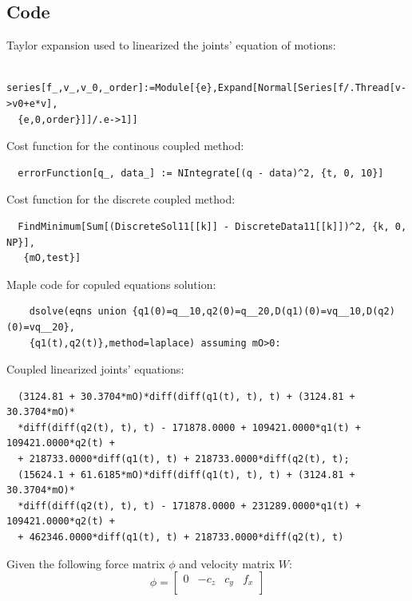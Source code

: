 \documentclass[a4paper,12pt,oneside]{report}
\begin{document}
\begin{appendices}
\chapter{Code}\label{code}
Taylor expansion used to linearized the joints' equation of motions:
\begin{small}
\begin{verbatim}
  series[f_,v_,v_0,_order]:=Module[{e},Expand[Normal[Series[f/.Thread[v->v0+e*v],
  {e,0,order}]]/.e->1]]
\end{verbatim}
\end{small}
Cost function for the continous coupled method:
\begin{small}
\begin{verbatim}
  errorFunction[q_, data_] := NIntegrate[(q - data)^2, {t, 0, 10}]
\end{verbatim}
\end{small}
Cost function for the discrete coupled method:
\begin{small}
  \begin{verbatim}
  FindMinimum[Sum[(DiscreteSol11[[k]] - DiscreteData11[[k]])^2, {k, 0, NP}],
   {mO,test}]
  \end{verbatim}
  \end{small}
Maple code for copuled equations solution:
\begin{small}
  \begin{verbatim}
    dsolve(eqns union {q1(0)=q__10,q2(0)=q__20,D(q1)(0)=vq__10,D(q2)(0)=vq__20},
    {q1(t),q2(t)},method=laplace) assuming mO>0:
  \end{verbatim}
  \end{small}
Coupled linearized joints' equations:
\begin{small}
  \begin{verbatim}
  (3124.81 + 30.3704*mO)*diff(diff(q1(t), t), t) + (3124.81 + 30.3704*mO)*
  *diff(diff(q2(t), t), t) - 171878.0000 + 109421.0000*q1(t) + 109421.0000*q2(t) +
  + 218733.0000*diff(q1(t), t) + 218733.0000*diff(q2(t), t);
  (15624.1 + 61.6185*mO)*diff(diff(q1(t), t), t) + (3124.81 + 30.3704*mO)*
  *diff(diff(q2(t), t), t) - 171878.0000 + 231289.0000*q1(t) + 109421.0000*q2(t) + 
  + 462346.0000*diff(q1(t), t) + 218733.0000*diff(q2(t), t)
  \end{verbatim}
  \end{small}
Given the following force matrix $\phi$ and velocity matrix $W$:
\begin{equation}
  \phi=\begin{bmatrix}
    0&-c_z&c_y&f_x\\

\end{bmatrix}
\end{equation}
\end{appendices}
\end{document}
